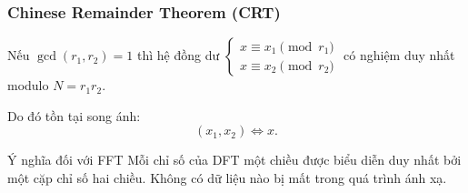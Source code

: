 \begin{frame}
\frametitle{Chinese Remainder Theorem (CRT)}

\begin{theorem}
Nếu $\gcd(r_1, r_2) = 1$ thì hệ đồng dư
\(
\begin{cases}
x \equiv x_1 \pmod{r_1} \\
x \equiv x_2 \pmod{r_2}
\end{cases}
\) có nghiệm duy nhất modulo $N = r_1 r_2$.
\end{theorem}

\pause
Do đó tồn tại song ánh:
\[
(x_1, x_2) \Longleftrightarrow x.
\]

\pause
\begin{block}{Ý nghĩa đối với FFT}
Mỗi chỉ số của DFT một chiều được biểu diễn duy nhất bởi một cặp chỉ số hai chiều. Không có dữ liệu nào bị mất trong quá trình ánh xạ.
\end{block}
\end{frame}

